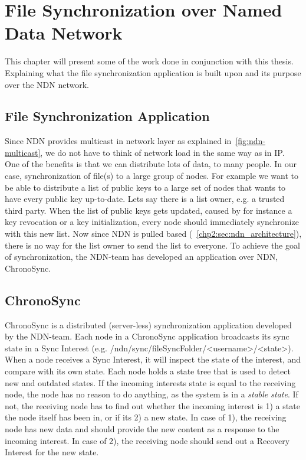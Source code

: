 \chapter{File Synchronization over Named Data Network}\label{chp3:application}
This chapter will present some of the work done in conjunction with this thesis. 
Explaining what the file synchronization application is built upon and its purpose over the \gls{NDN} network. 

\section{File Synchronization Application}\label{file-sync}
Since \gls{NDN} provides multicast in network layer as explained in~\autoref{fig:ndn-multicast}, we do not have to think of network load in the same way as in \gls{IP}.  
One of the benefits is that we can distribute lots of data, to many people. 
In our case, synchronization of file(s) to a large group of nodes. 
For example we want to be able to distribute a list of public keys to a large set of nodes that wants to have every public key up-to-date.
Lets say there is a list owner, e.g. a trusted third party. 
When the list of public keys gets updated, caused by for instance a key revocation or a key initialization, every node should immediately synchronize with this new list.
Now since \gls{NDN} is pulled based (~\autoref{chp2:sec:ndn_architecture}), there is no way for the list owner to send the list to everyone.
To achieve the goal of synchronization, the \gls{NDN}-team has developed an application over \gls{NDN}, ChronoSync.

\section{ChronoSync}\label{chronosync}
ChronoSync is a distributed (server-less) synchronization application developed by the \gls{NDN}-team. 
Each node in a ChronoSync application broadcasts its sync state in a Sync Interest (e.g. /ndn/sync/fileSyncFolder/<username>/<state>).
When a node receives a Sync Interest, it will inspect the state of the interest, and compare with its own state.
Each node holds a state tree that is used to detect new and outdated states.
If the incoming interests state is equal to the receiving node, the node has no reason to do anything, as the system is in a \textit{stable state}.
If not, the receiving node has to find out whether the incoming interest is 1) a state the node itself has been in, or if its 2) a new state.
In case of 1), the receiving node has new data and should provide the new content as a response to the incoming interest. In case of 2), the receiving node should send out a Recovery Interest for the new state.

